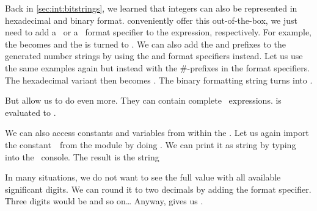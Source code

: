 %
\begin{sloppypar}%
Back in \cref{sec:int:bitstrings}, we learned that integers can also be represented in hexadecimal and binary format.
 conveniently offer this out-of-the-box, we just need to add a~ or a~ format specifier to the expression, respectively.
For example, the   becomes  and the   is turned to .
We can also add the  and  prefixes to the generated number strings by using the  and  format specifiers instead.
Let us use the same examples again but instead with the \#-prefixes in the format specifiers.
The hexadecimal variant  then becomes .
The binary formatting string  turns into .%
\end{sloppypar}%
%
\begin{sloppypar}%
But  allow us to do even more.
They can contain complete \python\ expressions.
 is evaluated to .%
\end{sloppypar}%
%
\begin{sloppypar}%
We can also access constants and variables from within the .
Let us again import the constant~\numberPi\ from the  module by doing .
We can print it as string by typing  into the \python\ console.
The result is the string %
\end{sloppypar}%
%
\begin{sloppypar}%
In many situations, we do not want to see the full  value with all available significant digits.
We can round it to two decimals by adding the  format specifier.
Three digits would be  and so on{\dots}
Anyway,  gives us .%
\end{sloppypar}%
